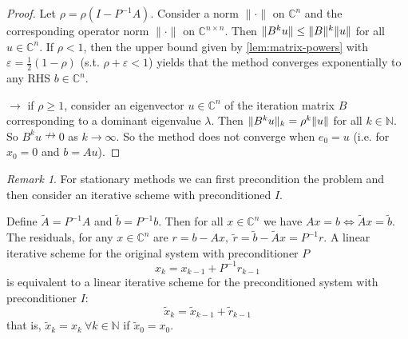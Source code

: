 \documentclass[12pt]{article}
\theoremstyle{definition}
\theoremstyle{remark}
\newtheorem{remark}[theorem]{Remark}
\numberwithin{equation}{section}
\newcommand{\C}{\mathbb{C}}
\newcommand{\N}{\mathbb{N}}
\newcommand{\normempty}{\|\cdot\|}
\DeclarePairedDelimiter{\norm}{\lVert}{\rVert}
\begin{document}
\begin{proof}
  Let $\rho = \rho(I-P^{-1}A)$. Consider a norm $\normempty$ on $\C^n$ and the corresponding operator norm $\normempty$ on $\C^{n\times n}$. Then $\norm{B^ku} \leq \norm{B}^k \norm{u}$ for all $u \in \C^n$. If $\rho < 1$, then the upper bound given by \ref{lem:matrix-powers} with $\varepsilon = \frac{1}{2} (1-\rho)$ (s.t. $\rho + \varepsilon < 1$) yields that the method converges exponentially to any RHS $b \in \C^n$.

  $\rightarrow$ if $\rho \geq 1$, consider an eigenvector $u \in \C^n$ of the iteration matrix $B$ corresponding to a dominant eigenvalue $\lambda$. Then $\norm{B^k u}_k = \rho^k \norm{u}$ for all $k \in \N$. So $B^k u \nrightarrow 0$ as $k \rightarrow \infty$. So the method does not converge when $e_0 = u$ (i.e. for $x_0 = 0$ and $b = Au$).
\end{proof}

\begin{remark}
  For stationary methods we can first precondition the problem and then consider an iterative scheme with preconditioned $I$.

  Define $\tilde{A} = P^{-1}A$ and $\tilde{b} = P^{-1}b$. Then for all $x \in \C^n$ we have $Ax = b \Leftrightarrow \tilde{A}x = \tilde{b}$. The residuals, for any $x \in \C^n$ are $r = b - Ax,\ \tilde{r} = \tilde{b} - \tilde{A}x = P^{-1}r$. A linear iterative scheme for the original system with preconditioner $P$
  \begin{equation*}
    x_k = x_{k-1} + P^{-1}r_{k-1}
  \end{equation*}
  is equivalent to a linear iterative scheme for the preconditioned system with preconditioner $I$:
  \begin{equation*}
    \tilde{x}_k = \tilde{x}_{k-1} + \tilde{r}_{k-1}
  \end{equation*}
  that is, $\tilde{x}_k = x_k\ \forall k \in \N$ if $\tilde{x}_0 = x_0$.
\end{remark}
\end{document}
